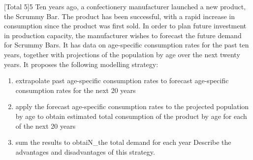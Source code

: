 \documentclass[a4paper,12pt]{article}
\begin{document}
 
[Total 5]5
Ten years ago, a confectionery manufacturer launched a new product, the Scrummy
Bar. The product has been successful, with a rapid increase in consumption since the product was first sold. In order to plan future investment in production capacity, the
manufacturer wishes to forecast the future demand for Scrummy Bars. It has data on age-specific consumption rates for the past ten years, together with projections of the
population by age over the next twenty years. It proposes the following modelling strategy:
\begin{enumerate}
\item extrapolate past age-specific consumption rates to forecast age-specific consumption rates for the next 20 years
\item apply the forecast age-specific consumption rates to the projected population by
age to obtain estimated total consumption of the product by age for each of the
next 20 years
\item sum the results to obtaiN_the total demand for each year
Describe the advantages and disadvantages of this strategy.
\end{enumerate}
\end{document}
